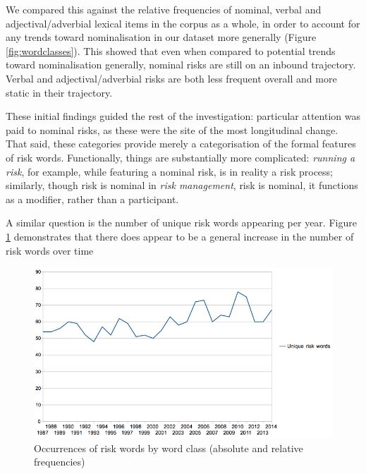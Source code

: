 

	We compared this against the relative frequencies of nominal, verbal and adjectival/adverbial lexical items in the corpus as a whole, in order to account for any trends toward nominalisation in our dataset more generally (Figure \ref{fig:wordclasses}). This showed that even when compared to potential trends toward nominalisation generally, nominal risks are still on an inbound trajectory. Verbal and adjectival\slash adverbial risks are both less frequent overall and more static in their trajectory.

	These initial findings guided the rest of the investigation: particular attention was paid to nominal risks, as these were the site of the most longitudinal change. That said, these categories provide merely a categorisation of the formal features of risk words. Functionally, things are substantially more complicated: \emph{running a risk}, for example, while featuring a nominal risk, is in reality a risk process; similarly, though risk is nominal in \emph{risk management}, risk is nominal, it functions as a modifier, rather than a participant.

    A similar question is the number of unique risk words appearing per year. Figure \ref{fig:diffriskwords} demonstrates that there does appear to be a general increase in the number of risk words over time

            \begin{figure}[htb!]
            \centering
            \includegraphics[width=1.0\textwidth]{../images/diffriskwords.png}
            \caption{Occurrences of risk words by word class (absolute and relative frequencies)}
            \label{fig:diffriskwords}
            \end{figure}


